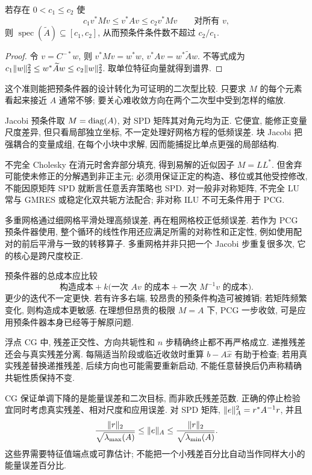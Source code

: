 \begin{proposition}[谱等价的含义]\label{prop:pcg-spectral-equivalence}
若存在 $0<c_1\le c_2$ 使
\[
c_1v^*Mv\le v^*Av\le c_2v^*Mv\qquad\text{对所有 }v,
\]
则 $\operatorname{spec}(\widetilde A)\subseteq[c_1,c_2]$, 从而预条件条件数不超过 $c_2/c_1$.
\end{proposition}
\begin{proof}
令 $v=C^{-*}w$, 则 $v^*Mv=w^*w$, $v^*Av=w^*\widetilde Aw$. 不等式成为 $c_1\lVert w\rVert_2^2\le w^*\widetilde Aw\le c_2\lVert w\rVert_2^2$. 取单位特征向量就得到谱界.
\end{proof}
这个准则能把预条件器的设计转化为可证明的二次型比较. 只要求 $M$ 的每个元素看起来接近 $A$ 通常不够; 要关心难收敛方向在两个二次型中受到怎样的缩放.

Jacobi 预条件取 $M=\operatorname{diag}(A)$, 对 SPD 矩阵其对角元均为正. 它便宜, 能修正变量尺度差异, 但只看局部独立坐标, 不一定处理好网格方程的低频误差. 块 Jacobi 把强耦合的变量成组, 在每个小块中求解, 因而能捕捉比单点更强的局部结构.

不完全 Cholesky 在消元时舍弃部分填充, 得到易解的近似因子 $M=LL^*$. 但舍弃可能使未修正的分解遇到非正主元; 必须用保证正定的构造、移位或其他受控修改, 不能因原矩阵 SPD 就断言任意丢弃策略也 SPD. 对一般非对称矩阵, 不完全 LU 常与 GMRES 或稳定化双共轭方法配合; 非对称 ILU 不可无条件用于 PCG.

多重网格通过细网格平滑处理高频误差, 再在粗网格校正低频误差. 若作为 PCG 预条件器使用, 整个循环的线性作用还应满足所需的对称性和正定性, 例如使用配对的前后平滑与一致的转移算子. 多重网格并非只把一个 Jacobi 步重复很多次, 它的核心是跨尺度校正.

预条件器的总成本应比较
\[
\text{构造成本}+k\bigl(\text{一次 }Av\text{ 的成本}+\text{一次 }M^{-1}v\text{ 的成本}\bigr).
\]
更少的迭代不一定更快. 若有许多右端, 较昂贵的预条件构造可被摊销; 若矩阵频繁变化, 则构造成本更敏感. 在理想但昂贵的极限 $M=A$ 下, PCG 一步收敛, 可是应用预条件器本身已经等于解原问题.

浮点 CG 中, 残差正交性、方向共轭性和 $n$ 步精确终止都不再严格成立. 递推残差还会与真实残差分离. 每隔适当阶段或临近收敛时重算 $b-A\widehat x$ 有助于检查; 若用真实残差替换递推残差, 后续方向也可能需要重新启动, 不能任意替换后仍声称精确共轭性质保持不变.

CG 保证单调下降的是能量误差和二次目标, 而非欧氏残差范数. 正确的停止检验宜同时考虑真实残差、相对尺度和应用误差. 对 SPD 矩阵, $\lVert e\rVert_A^2=r^*A^{-1}r$, 并且
\[
\frac{\lVert r\rVert_2}{\sqrt{\lambda_{\max}(A)}}
\le\lVert e\rVert_A\le
\frac{\lVert r\rVert_2}{\sqrt{\lambda_{\min}(A)}}.
\]
这些界需要特征值端点或可靠估计; 不能把一个小残差百分比自动当作同样大小的能量误差百分比.

